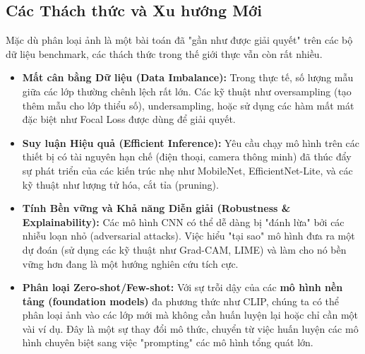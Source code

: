 \subsection{Các Thách thức và Xu hướng Mới}
\label{subsec:classification_challenges_trends}
Mặc dù phân loại ảnh là một bài toán đã "gần như được giải quyết" trên các bộ dữ liệu benchmark, các thách thức trong thế giới thực vẫn còn rất nhiều.

\begin{itemize}
    \item \textbf{Mất cân bằng Dữ liệu (Data Imbalance):} Trong thực tế, số lượng mẫu giữa các lớp thường chênh lệch rất lớn. Các kỹ thuật như oversampling (tạo thêm mẫu cho lớp thiểu số), undersampling, hoặc sử dụng các hàm mất mát đặc biệt như Focal Loss được dùng để giải quyết.
    \item \textbf{Suy luận Hiệu quả (Efficient Inference):} Yêu cầu chạy mô hình trên các thiết bị có tài nguyên hạn chế (điện thoại, camera thông minh) đã thúc đẩy sự phát triển của các kiến trúc nhẹ như MobileNet, EfficientNet-Lite, và các kỹ thuật như lượng tử hóa, cắt tỉa (pruning).
    \item \textbf{Tính Bền vững và Khả năng Diễn giải (Robustness \& Explainability):} Các mô hình CNN có thể dễ dàng bị "đánh lừa" bởi các nhiễu loạn nhỏ (adversarial attacks). Việc hiểu "tại sao" mô hình đưa ra một dự đoán (sử dụng các kỹ thuật như Grad-CAM, LIME) và làm cho nó bền vững hơn đang là một hướng nghiên cứu tích cực.
    \item \textbf{Phân loại Zero-shot/Few-shot:} Với sự trỗi dậy của các \textbf{mô hình nền tảng (foundation models)} đa phương thức như CLIP, chúng ta có thể phân loại ảnh vào các lớp mới mà không cần huấn luyện lại hoặc chỉ cần một vài ví dụ. Đây là một sự thay đổi mô thức, chuyển từ việc huấn luyện các mô hình chuyên biệt sang việc "prompting" các mô hình tổng quát lớn.
\end{itemize}

